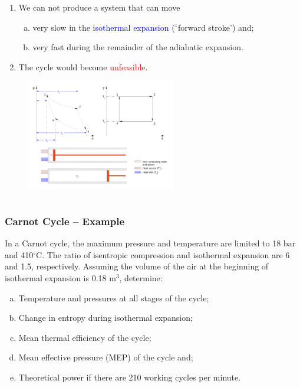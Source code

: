 \documentclass[10pt,compress]{beamer}
\newcommand{\red}{\textcolor{red}}
\newcommand{\blue}{\textcolor{blue}}
\begin{document}
\begin{frame}
\begin{columns}
\begin{column}[c]{0.55\linewidth}
\begin{enumerate}[(1)]
     \item<4-> We can not produce a system that can move
     \begin{enumerate}[(a)] \scriptsize
        \item<4-> very slow in the \blue{isothermal expansion} ($\lq$forward stroke') and;
        \item<4-> very fast during the remainder of the adiabatic expansion. 
     \end{enumerate}
     \item<5-> The cycle would become \red{unfeasible}.
   \end{enumerate} 
   \begin{figure}%
    \begin{center}
     \includegraphics[width=6.5cm,clip]{./Pics/Carnot_Reciprocating}
    \end{center}
   \end{figure} 
  \end{column}  
 \end{columns} 
\end{frame}

\begin{frame}
 \frametitle{Carnot Cycle -- Example}
     In a Carnot cycle, the maximum pressure and temperature are limited to 18 bar and 410$^{\circ}$C. The ratio of isentropic compression and isothermal expansion are 6 and 1.5, respectively. Assuming the volume of the air at the beginning of isothermal expansion is 0.18 m$^{3}$, determine:
       \begin{enumerate}[(a)]
          \item Temperature and pressures at all stages of the cycle; 
          \item Change in entropy during isothermal expansion; 
          \item Mean thermal efficiency of the cycle; 
          \item Mean effective pressure (MEP) of the cycle and;
          \item Theoretical power if there are 210 working cycles per minute.
       \end{enumerate}
\end{frame}
\end{document}
